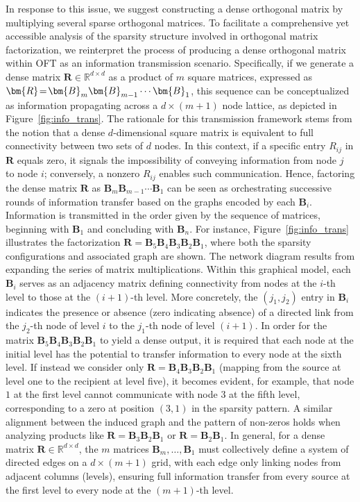 In response to this issue, we suggest constructing a dense orthogonal matrix by multiplying several sparse orthogonal matrices. To facilitate a comprehensive yet accessible analysis of the sparsity structure involved in orthogonal matrix factorization, we reinterpret the process of producing a dense orthogonal matrix within OFT as an information transmission scenario. Specifically, if we generate a dense matrix $\bm{R}\in\mathbb{R}^{d\times d}$ as a product of $m$ square matrices, expressed as $\thickmuskip=2mu \medmuskip=2mu \bm{R}=\bm{B}_m\bm{B}_{m-1}\cdots\bm{B}_1$, this sequence can be conceptualized as information propagating across a $d\times (m+1)$ node lattice, as depicted in Figure~\ref{fig:info_trans}. The rationale for this transmission framework stems from the notion that a dense $d$-dimensional square matrix is equivalent to full connectivity between two sets of $d$ nodes. In this context, if a specific entry $R_{ij}$ in $\bm{R}$ equals zero, it signals the impossibility of conveying information from node $j$ to node $i$; conversely, a nonzero $R_{ij}$ enables such communication. Hence, factoring the dense matrix $\bm{R}$ as $\bm{B}_m\bm{B}_{m-1}\cdots\bm{B}_1$ can be seen as orchestrating successive rounds of information transfer based on the graphs encoded by each $\bm{B}_i$. Information is transmitted in the order given by the sequence of matrices, beginning with $\bm{B}_1$ and concluding with $\bm{B}_n$. For instance, Figure~\ref{fig:info_trans} illustrates the factorization $\bm{R}=\bm{B}_5\bm{B}_4\bm{B}_3\bm{B}_2\bm{B}_1$, where both the sparsity configurations and associated graph are shown. The network diagram results from expanding the series of matrix multiplications. Within this graphical model, each $\bm{B}_i$ serves as an adjacency matrix defining connectivity from nodes at the $i$-th level to those at the $(i+1)$-th level. More concretely, the $(j_1, j_2)$ entry in $\bm{B}_i$ indicates the presence or absence (zero indicating absence) of a directed link from the $j_2$-th node of level $i$ to the $j_1$-th node of level $(i+1)$. In order for the matrix $\bm{B}_5\bm{B}_4\bm{B}_3\bm{B}_2\bm{B}_1$ to yield a dense output, it is required that each node at the initial level has the potential to transfer information to every node at the sixth level. If instead we consider only $\bm{R}=\bm{B}_4\bm{B}_3\bm{B}_2\bm{B}_1$ (mapping from the source at level one to the recipient at level five), it becomes evident, for example, that node $1$ at the first level cannot communicate with node $3$ at the fifth level, corresponding to a zero at position $(3,1)$ in the sparsity pattern. A similar alignment between the induced graph and the pattern of non-zeros holds when analyzing products like $\bm{R}=\bm{B}_3\bm{B}_2\bm{B}_1$ or $\bm{R}=\bm{B}_2\bm{B}_1$. In general, for a dense matrix $\bm{R}\in\mathbb{R}^{d\times d}$, the $m$ matrices $\bm{B}_m,\dots,\bm{B}_1$ must collectively define a system of directed edges on a $d\times(m+1)$ grid, with each edge only linking nodes from adjacent columns (levels), ensuring full information transfer from every source at the first level to every node at the $(m+1)$-th level.

